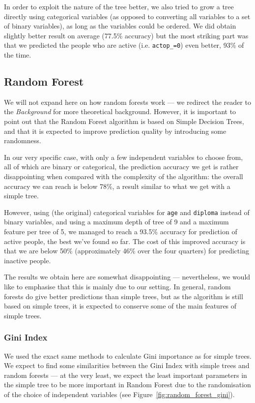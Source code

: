In order to exploit the nature of the tree better, we also tried to grow a tree directly using categorical variables (as opposed to converting all variables to a set of binary variables), as long as the variables could be ordered. We did obtain slightly better result on average (77.5\% accuracy) but the most striking part was that we predicted the people who are active (i.e. \texttt{actop\_=0}) even better, 93\% of the time.


\subsection{Random Forest}

We will not expand here on how random forests work --- we redirect the reader to the \textit{Background} for more theoretical background. However, it is important to point out that the Random Forest algorithm is based on Simple Decision Trees, and that it is expected to improve prediction quality by introducing some randomness.

In our very specific case, with only a few independent variables to choose from, all of which are binary or categorical, the prediction accuracy we get is rather disappointing when compared with the complexity of the algorithm: the overall accuracy we can reach is below 78\%, a result similar to what we get with a simple tree.

However, using (the original) categorical variables for \texttt{age} and \texttt{diploma} instead of binary variables, and using a maximum depth of tree of 9 and a maximum feature per tree of 5, we managed to reach a 93.5\% accuracy for prediction of active people, the best we’ve found so far. The cost of this improved accuracy is that we are below 50\% (approximately 46\% over the four quarters) for predicting inactive people.

The results we obtain here are somewhat disappointing --- nevertheless, we would like to emphasise that this is mainly due to our setting. In general, random forests do give better predictions than simple trees, but as the algorithm is still based on simple trees, it is expected to conserve some of the main features of simple trees.

\subsubsection{Gini Index}
We used the exact same methods to calculate Gini importance as for simple trees. We expect to find some similarities between the Gini Index with simple trees and random forests --- at the very least, we expect the least important parameters in the simple tree to be more important in Random Forest due to the randomisation of the choice of independent variables (see Figure~\ref{fig:random_forest_gini}).

